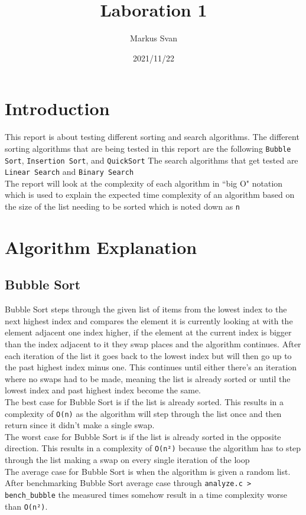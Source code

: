\documentclass{article}
\title{Laboration 1}
\author{Markus Svan}
\date{2021/11/22}
\begin{document}
    \maketitle
    \newpage
    \tableofcontents
    \newpage
    \section{Introduction}
    This report is about testing different sorting and search algorithms. The different sorting algorithms that are being tested in this report are the following \texttt{Bubble Sort}, \texttt{Insertion Sort}, and \texttt{QuickSort}
    The search algorithms that get tested are \texttt{Linear Search} and \texttt{Binary Search}\\
    The report will look at the complexity of each algorithm in ``big O" notation which is used to explain the expected time complexity of an algorithm based on the size of the list needing to be sorted which is noted down as \texttt{n}
    \section{Algorithm Explanation}
    \subsection{Bubble Sort}
    Bubble Sort steps through the given list of items from the lowest index to the next highest index and compares the element it is currently looking at with the element adjacent one 
    index higher, if the element at the current index is bigger than the index adjacent to it they swap places and the algorithm continues.
    After each iteration of the list it goes back to the lowest index but will then go up to the past highest index minus one.
    This continues until either there's an iteration where no swaps had to be made, meaning the list is already sorted or until the lowest index and past highest index become the same.\\
    The best case for Bubble Sort is if the list is already sorted. This results in a complexity of \texttt{O(n)} as the algorithm will step through the list once and then return since it didn't make a single swap.\\
    The worst case for Bubble Sort is if the list is already sorted in the opposite direction. This results in a complexity of \texttt{O(n²)} because the algorithm has to step through the list making a swap on every single iteration of the loop\\
    The average case for Bubble Sort is when the algorithm is given a random list. After benchmarking Bubble Sort average case through \texttt{analyze.c > bench\_bubble} the measured times somehow result in a time complexity worse than \texttt{O(n²)}.
\end{document}
